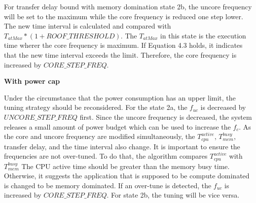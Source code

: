 For transfer delay bound with memory domination state 2b, the uncore frequency will be set to the maximum while the core frequency is reduced one step lower. The new time interval is calculated and compared with $T_{atMax}* (1 + ROOF\_THRESHOLD)$. The $T_{atMax}$ in this state is the execution time wherer the core frequency is maximum. If Equation 4.3 holds, it indicates that the new time interval exceeds the limit. Therefore, the core frequency is increased by $CORE\_STEP\_FREQ$.

\textbf{With power cap}

Under the circumstance that the power consumption has an upper limit, the tuning strategy should be reconsidered. For the state 2a, the $f_{uc}$ is decreased by $UNCORE\_STEP\_FREQ$ first. Since the uncore frequency is decreased, the system releases a small amount of power budget which can be used to increase the $f_c$. As the core and uncore frequency are modified simultaneously, the $T^{active}_{cpu}$, $T^{busy}_{mem}$, transfer delay, and the time interval also change. It is important to ensure the frequencies are not over-tuned. To do that, the algorithm compares $T^{active}_{cpu}$ with $T^{busy}_{mem}$ The CPU active time should be greater than the memory busy time. Otherwise, it suggests the application that is supposed to be compute dominated is changed to be memory dominated. If an over-tune is detected, the $f_{uc}$ is increased by $CORE\_STEP\_FREQ$. For state 2b, the tuning will be vice versa.
%

